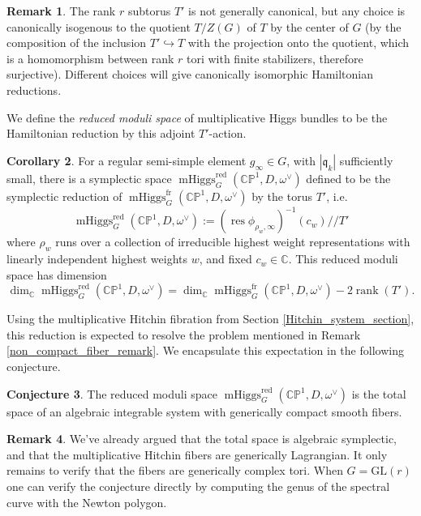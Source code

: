 \documentclass[11pt, oneside, reqno]{amsart}
\theoremstyle{definition} \newtheorem{definition}{Definition}[section]
\newtheorem{conjecture}[definition]{Conjecture}
\newtheorem{corollary}[definition]{Corollary}
\theoremstyle{definition} \newtheorem{remark}[definition]{Remark}
\theoremstyle{definition} \newtheorem{remarks}[definition]{Remarks}
\theoremstyle{definition} \newtheorem{question}[definition]{Question}
\theoremstyle{definition} \newtheorem*{note}{Note}
\theoremstyle{definition} \newtheorem{example}[definition]{Example}
\theoremstyle{definition} \newtheorem{examples}[definition]{Examples}
\newcommand{\qq}{\mathfrak{q}}
\newcommand{\bb}[1]{\mathbb{#1}}
\newcommand{\inj}{\hookrightarrow}
\newcommand{\GL}{\mathrm{GL}}
\DeclareMathOperator{\rank}{rank}
\DeclareMathOperator{\res}{res}
\DeclareMathOperator{\mhiggs}{mHiggs}
\newcommand{\fr}{\mathrm{fr}}
\newcommand{\red}{\mathrm{red}}
\begin{document}
\begin{remark}
The rank $r$ subtorus $T'$ is not generally canonical, but any choice is canonically isogenous to the quotient $T/Z(G)$ of $T$ by the center of $G$ (by the composition of the inclusion $T' \inj T$ with the projection onto the quotient, which is a homomorphism between rank $r$ tori with finite stabilizers, therefore surjective).  Different choices will give canonically isomorphic Hamiltonian reductions.
\end{remark}

We define the \emph{reduced moduli space} of multiplicative Higgs bundles to be the Hamiltonian reduction by this adjoint $T'$-action.

\begin{corollary}
  For a regular semi-simple element $g_\infty \in G$, with $|\qq_k|$ sufficiently small, there is a symplectic space $\mhiggs^\red_G(\bb{CP}^1, D, \omega^\vee)$ defined to be the symplectic reduction of $\mhiggs^\fr_G(\bb{CP}^1, D, \omega^\vee)$ by the torus $T'$, i.e.
  \[\mhiggs^\red_G(\bb{CP}^1, D, \omega^\vee) := (\res \phi_{\rho_{w}, \infty} )^{-1} (c_{w}) // T'\]
  where $\rho_{w}$ runs over a collection of irreducible highest weight representations with linearly independent highest weights $w$,  and fixed $c_{w} \in \mathbb{C}$. This reduced moduli space has dimension
  \begin{equation}
    \label{eq:dim-reduced}
\dim_{\mathbb{C}} \mhiggs^\red_G(\bb{CP}^1, D, \omega^\vee)  =    \dim_{\mathbb{C}}  \mhiggs^\fr_G(\bb{CP}^1, D, \omega^\vee) - 2 \rank(T').
    \end{equation}
\end{corollary}

Using the multiplicative Hitchin fibration from Section \ref{Hitchin_system_section}, this reduction is expected to resolve the problem mentioned in Remark \ref{non_compact_fiber_remark}.  We encapsulate this expectation in the following conjecture.

\begin{conjecture}
The reduced moduli space $\mhiggs^\red_G(\bb{CP}^1, D, \omega^\vee)$ is the total space of an algebraic integrable system with generically compact smooth fibers.
\end{conjecture}

\begin{remark}
We've already argued that the total space is algebraic symplectic, and that the multiplicative Hitchin fibers are generically Lagrangian.  It only remains to verify that the fibers are generically complex tori.  When $G = \GL(r)$ one can verify the conjecture directly by computing the genus of the spectral curve with the Newton polygon. 
\end{remark}
\end{document}
